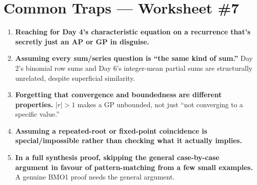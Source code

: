 \documentclass[11pt,a4paper]{article}
\begin{document}
\section*{Common Traps --- Worksheet \#7}
\begin{enumerate}[leftmargin=2em,itemsep=4pt]
  \item \textbf{Reaching for Day 4's characteristic equation on a recurrence that's secretly just an AP or GP in disguise.} 
  \item \textbf{Assuming every sum/series question is ``the same kind of sum.''} Day 2's binomial row sums and Day 6's integer-mean partial sums are structurally unrelated, despite superficial similarity. 
  \item \textbf{Forgetting that convergence and boundedness are different properties.} $|r|>1$ makes a GP unbounded, not just ``not converging to a specific value.'' 
  \item \textbf{Assuming a repeated-root or fixed-point coincidence is special/impossible rather than checking what it actually implies.} 
  \item \textbf{In a full synthesis proof, skipping the general case-by-case argument in favour of pattern-matching from a few small examples.} A genuine BMO1 proof needs the general argument. 
\end{enumerate}

\end{document}
